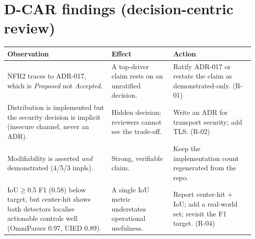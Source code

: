 \documentclass[11pt,a4paper]{report}
\begin{document}
\section{D-CAR findings (decision-centric review)}
\begin{longtable}{@{}p{4.6cm}p{5.0cm}p{4.4cm}@{}}
\toprule
\textbf{Observation} & \textbf{Effect} & \textbf{Action} \\
\midrule
\endhead
NFR2 traces to ADR-017, which is \emph{Proposed} not \emph{Accepted}. & A top-driver claim rests on an unratified decision. & Ratify ADR-017 or restate the claim as demonstrated-only. (R-01) \\
Distribution is implemented but the security decision is implicit (insecure channel, never an ADR). & Hidden decision; reviewers cannot see the trade-off. & Write an ADR for transport security; add TLS. (R-02) \\
Modifiability is asserted \emph{and} demonstrated (4/5/3 impls). & Strong, verifiable claim. & Keep the implementation count regenerated from the repo. \\
IoU$\geq$0.5 F1 (0.58) below target, but center-hit shows both detectors localise actionable controls well (OmniParser 0.97, UIED 0.89). & A single IoU metric understates operational usefulness. & Report center-hit + IoU; add a real-world set; revisit the F1 target. (R-04) \\
\bottomrule
\end{longtable}

\end{document}
